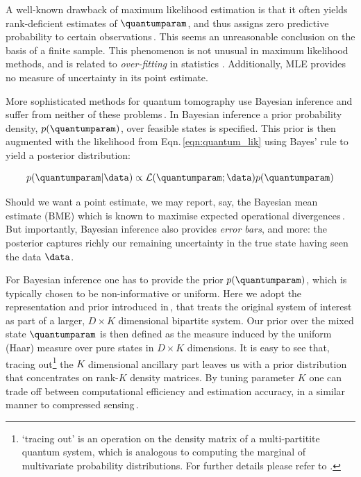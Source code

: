A well-known drawback of maximum likelihood estimation is that it often yields rank-deficient estimates of $\quantumparam$, and thus assigns zero predictive probability to certain observations\,\citep{BayesianTomography}. This seems an unreasonable conclusion on the basis of a finite sample. This phenomenon is not unusual in maximum likelihood methods, and is related to \emph{over-fitting} in statistics \citep{Hawkins2004}. Additionally, MLE provides no measure of uncertainty in its point estimate.

More sophisticated methods for quantum tomography use Bayesian inference and suffer from neither of these problems\,\cite[][and refs.]{BayesianTomography}. In Bayesian inference a prior probability density, $p(\quantumparam)$, over feasible states is specified. This prior is then augmented with the likelihood from Eqn.\,\eqref{eqn:quantum_lik} using Bayes' rule to yield a posterior distribution:

\begin{equation}
	\label{eqn:quantum_bayes}
	p(\quantumparam\vert\data)\propto \mathcal{L}(\quantumparam;\data)p(\quantumparam)
\end{equation}

Should we want a point estimate, we may report, say, the Bayesian mean estimate (BME) which is known to maximise expected operational divergences\,\citep{BayesianTomography,BayesianOptimality}. But importantly, Bayesian inference also provides \emph{error bars}, and more: the posterior captures richly our remaining uncertainty in the true state having seen the data $\data$. 

For Bayesian inference one has to provide the prior $p(\quantumparam)$, which is typically chosen to be non-informative or uniform. Here we adopt the representation and prior introduced in\,\citep{BayesianTomography}, that treats the original system of interest as part of a larger, $D \times K$ dimensional bipartite system. Our prior over the mixed state $\quantumparam$ is then defined as the measure induced by the uniform (Haar) measure over pure states in $D\times K$ dimensions. It is easy to see that, tracing out\footnote{`tracing out' is an operation on the density matrix of a multi-partitite quantum system, which is analogous to computing the marginal of multivariate probability distributions. For further details please refer to \citep{BayesianTomography}.} the $K$ dimensional ancillary part leaves us with a prior distribution that concentrates on rank-$K$ density matrices. By tuning parameter $K$ one can trade off between computational efficiency and estimation accuracy, in a similar manner to compressed sensing\,\citep{CompressedSensing}.

